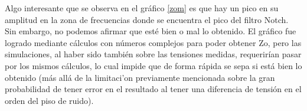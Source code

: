 Algo interesante que se observa en el gr\'afico \ref{zom} es que hay un pico en su amplitud en la zona de frecuencias donde se encuentra el pico del filtro Notch. Sin embargo, no podemos afirmar que est\'e bien o mal lo obtenido. El gr\'afico fue logrado mediante c\'alculos con n\'umeros complejos para poder obtener Zo, pero las simulaciones, al haber sido tambi\'en sobre las tensiones medidas, requerir\'ian pasar por los mismos c\'alculos, lo cual impide que de forma r\'apida se sepa si est\'a bien lo obtenido (m\'as all\'a de la limitaci'on previamente mencionada sobre la gran probabilidad de tener error en el resultado al tener una diferencia de tensi\'on en el orden del piso de ruido).


